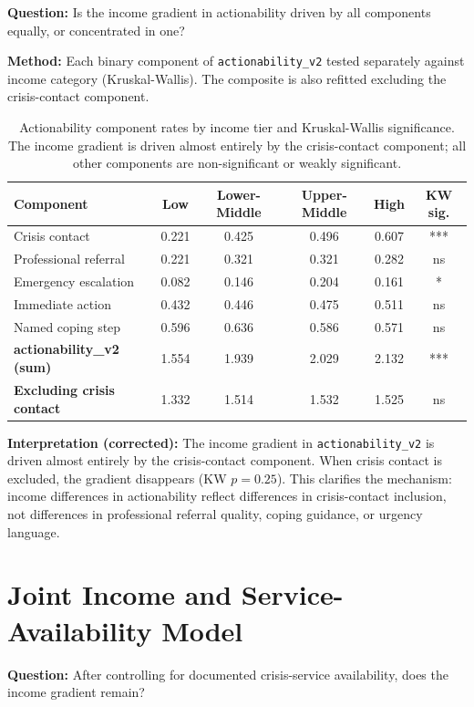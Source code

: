 \textbf{Question:} Is the income gradient in actionability driven by all components equally, or concentrated in one?

\textbf{Method:} Each binary component of \texttt{actionability\_v2} tested separately against income category (Kruskal-Wallis). The composite is also refitted excluding the crisis-contact component.

\begin{table}[H]
\centering
\caption{Actionability component rates by income tier and Kruskal-Wallis significance. The income gradient is driven almost entirely by the crisis-contact component; all other components are non-significant or weakly significant.}
\label{tab:components}
\begin{tabular}{lccccc}
\toprule
Component & Low & Lower-Middle & Upper-Middle & High & KW sig. \\
\midrule
Crisis contact & 0.221 & 0.425 & 0.496 & 0.607 & *** \\
Professional referral & 0.221 & 0.321 & 0.321 & 0.282 & ns \\
Emergency escalation & 0.082 & 0.146 & 0.204 & 0.161 & * \\
Immediate action & 0.432 & 0.446 & 0.475 & 0.511 & ns \\
Named coping step & 0.596 & 0.636 & 0.586 & 0.571 & ns \\
\midrule
\textbf{actionability\_v2 (sum)} & 1.554 & 1.939 & 2.029 & 2.132 & *** \\
\textbf{Excluding crisis contact} & 1.332 & 1.514 & 1.532 & 1.525 & ns \\
\bottomrule
\end{tabular}
\end{table}

\textbf{Interpretation (corrected):} The income gradient in \texttt{actionability\_v2} is driven almost entirely by the crisis-contact component. When crisis contact is excluded, the gradient disappears (KW $p = 0.25$). This clarifies the mechanism: income differences in actionability reflect differences in crisis-contact inclusion, not differences in professional referral quality, coping guidance, or urgency language.

\section{Joint Income and Service-Availability Model}
\label{sec:joint_model}

\textbf{Question:} After controlling for documented crisis-service availability, does the income gradient remain?

